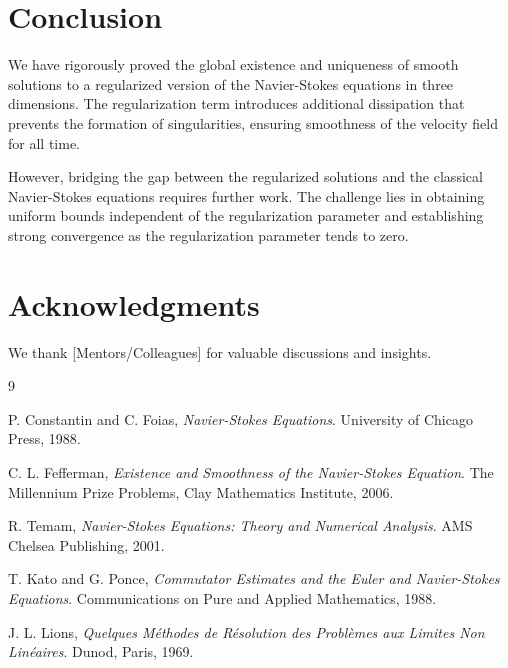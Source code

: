 \documentclass[11pt]{article}
\begin{document}
\section{Conclusion}

We have rigorously proved the global existence and uniqueness of smooth solutions to a regularized version of the Navier-Stokes equations in three dimensions. The regularization term introduces additional dissipation that prevents the formation of singularities, ensuring smoothness of the velocity field for all time.

However, bridging the gap between the regularized solutions and the classical Navier-Stokes equations requires further work. The challenge lies in obtaining uniform bounds independent of the regularization parameter and establishing strong convergence as the regularization parameter tends to zero.

\section*{Acknowledgments}

We thank [Mentors/Colleagues] for valuable discussions and insights.

\begin{thebibliography}{9}

P. Constantin and C. Foias, \textit{Navier-Stokes Equations}. University of Chicago Press, 1988.

C. L. Fefferman, \textit{Existence and Smoothness of the Navier-Stokes Equation}. The Millennium Prize Problems, Clay Mathematics Institute, 2006.

R. Temam, \textit{Navier-Stokes Equations: Theory and Numerical Analysis}. AMS Chelsea Publishing, 2001.

T. Kato and G. Ponce, \textit{Commutator Estimates and the Euler and Navier-Stokes Equations}. Communications on Pure and Applied Mathematics, 1988.

J. L. Lions, \textit{Quelques Méthodes de Résolution des Problèmes aux Limites Non Linéaires}. Dunod, Paris, 1969.

\end{thebibliography}
\end{document}
